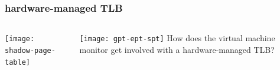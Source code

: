 \begin{frame}
	\frametitle{hardware-managed TLB}
	
	
	
	\begin{columns}
		
		\begin{column}{.4\textwidth}
			\centering
			\texttt{[image: shadow-page-table]}
			
		\end{column}
		
		\begin{column}{.6\textwidth}
			
			\texttt{[image: gpt-ept-spt]}
			 How does the virtual machine monitor get involved with a
			hardware-managed TLB?	
			
%				

			
			
		\end{column}
		
		
	\end{columns}
	
	
\end{frame}


